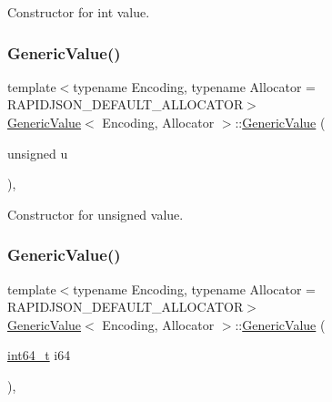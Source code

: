Constructor for int value. 

\mbox{\label{classGenericValue_a972bff6c56ac3d04622ff7fad8d98331}} 
\subsubsection{\texorpdfstring{Generic\+Value()}{GenericValue()}\hspace{0.1cm}{\footnotesize\ttfamily [7/17]}}
{\footnotesize\ttfamily template$<$typename Encoding, typename Allocator = R\+A\+P\+I\+D\+J\+S\+O\+N\+\_\+\+D\+E\+F\+A\+U\+L\+T\+\_\+\+A\+L\+L\+O\+C\+A\+T\+OR$>$ \\
\hyperlink{classGenericValue}{Generic\+Value}$<$ Encoding, Allocator $>$\+::\hyperlink{classGenericValue}{Generic\+Value} (\begin{DoxyParamCaption}\item[{unsigned}]{u }\end{DoxyParamCaption})\hspace{0.3cm}{\ttfamily [inline]}, {\ttfamily [explicit]}}



Constructor for unsigned value. 

\mbox{\label{classGenericValue_a964b69f1d2596f75ded5421b6db01a14}} 
\subsubsection{\texorpdfstring{Generic\+Value()}{GenericValue()}\hspace{0.1cm}{\footnotesize\ttfamily [8/17]}}
{\footnotesize\ttfamily template$<$typename Encoding, typename Allocator = R\+A\+P\+I\+D\+J\+S\+O\+N\+\_\+\+D\+E\+F\+A\+U\+L\+T\+\_\+\+A\+L\+L\+O\+C\+A\+T\+OR$>$ \\
\hyperlink{classGenericValue}{Generic\+Value}$<$ Encoding, Allocator $>$\+::\hyperlink{classGenericValue}{Generic\+Value} (\begin{DoxyParamCaption}\item[{\hyperlink{stdint_8h_a414156feea104f8f75b4ed9e3121b2f6}{int64\+\_\+t}}]{i64 }\end{DoxyParamCaption})\hspace{0.3cm}{\ttfamily [inline]}, {\ttfamily [explicit]}}



